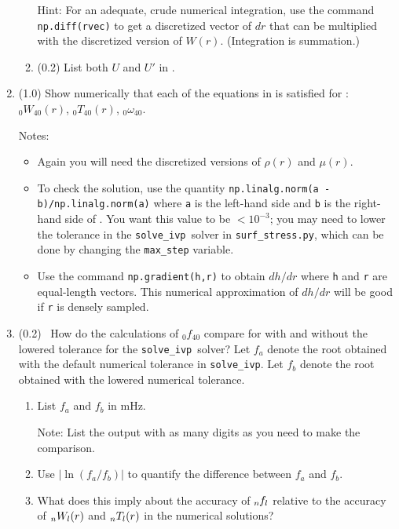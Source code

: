 \documentclass[11pt,titlepage,fleqn]{article}
\newcommand{\tfileB}{{\tt surf\_stress.py}}
\newcommand{\sfind}{{\tt solve\_ivp}}
\begin{document}
\begin{enumerate}
\begin{enumerate}
Hint: For an adequate, crude numerical integration, use the command \verb+np.diff(rvec)+ to get a discretized vector of $dr$ that can be multiplied with the discretized version of $W(r)$. (Integration is summation.)

\item (0.2) List both $U$ and $U'$ in .
\end{enumerate}

\label{prob:0T40_cubic_group}

\item (1.0) Show numerically that each of the equations in  is satisfied for : $_0W_{40}(r)$, $_0T_{40}(r)$, $_0\omega_{40}$.

Notes:
%
\begin{itemize}
\item Again you will need the discretized versions of $\rho(r)$ and $\mu(r)$.

\item To check the solution, use the quantity \verb+np.linalg.norm(a - b)/np.linalg.norm(a)+ where \verb+a+ is the left-hand side and \verb+b+ is the right-hand side of . You want this value to be $< 10^{-3}$; you may need to lower the tolerance in the \sfind\ solver in \tfileB, which can be done by changing the \verb+max_step+ variable.

\item Use the command \verb+np.gradient(h,r)+ to obtain $dh/dr$ where \verb+h+ and \verb+r+ are equal-length vectors. This numerical approximation of $dh/dr$ will be good if \verb+r+ is densely sampled.
\end{itemize}

\item (0.2) \ptag\ How do the calculations of $_0f_{40}$ compare for with and without the lowered tolerance for the \sfind\ solver? 
Let $f_a$ denote the root obtained with the default numerical tolerance in \sfind. Let $f_b$ denote the root obtained with the lowered numerical tolerance. 
%
\begin{enumerate}
\item
List $f_a$ and $f_b$ in mHz.

Note: List the output with as many digits as you need to make the comparison.

\item Use $|\ln(f_a/f_b)|$ to quantify the difference between $f_a$ and $f_b$.

\item What does this imply about the accuracy of $\mbox{${}_{n\hspace{-0.2 mm}}f_l$}$ relative to the accuracy of $\mbox{${}_nW_l$}(r)$ and $\mbox{${}_nT_l$}(r)$ in the numerical solutions?
\end{enumerate}

\end{enumerate}
\end{document}

